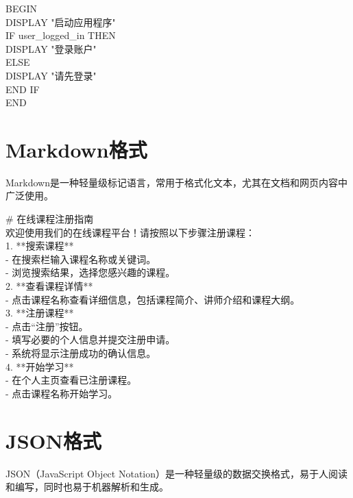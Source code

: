 \documentclass[12pt]{book}
\begin{document}
\begin{tcolorbox}
BEGIN\\
DISPLAY "启动应用程序"\\
IF user\_logged\_in THEN\\
DISPLAY "登录账户"\\
ELSE\\
DISPLAY "请先登录"\\
END IF\\
END\\
\end{tcolorbox}	

\section{Markdown格式}
Markdown是一种轻量级标记语言，常用于格式化文本，尤其在文档和网页内容中广泛使用。


\begin{tcolorbox}
\# 在线课程注册指南\\

欢迎使用我们的在线课程平台！请按照以下步骤注册课程：\\

1. **搜索课程**\\
- 在搜索栏输入课程名称或关键词。\\
- 浏览搜索结果，选择您感兴趣的课程。\\

2. **查看课程详情**\\
- 点击课程名称查看详细信息，包括课程简介、讲师介绍和课程大纲。\\

3. **注册课程**\\
- 点击“注册”按钮。\\
- 填写必要的个人信息并提交注册申请。\\
- 系统将显示注册成功的确认信息。\\

4. **开始学习**\\
- 在个人主页查看已注册课程。\\
- 点击课程名称开始学习。\\

\end{tcolorbox}	

\section{JSON格式}
JSON（JavaScript Object Notation）是一种轻量级的数据交换格式，易于人阅读和编写，同时也易于机器解析和生成。
\end{document}
